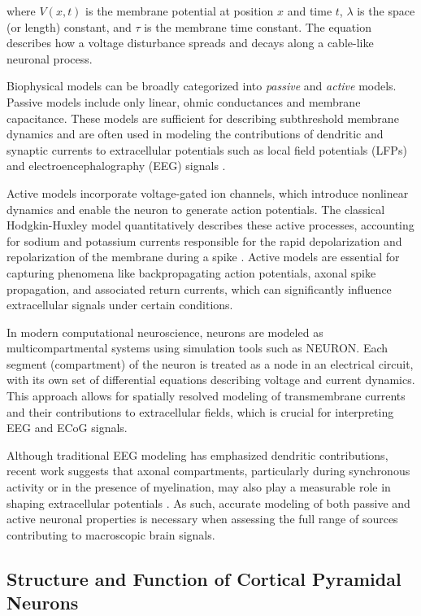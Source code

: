 \documentclass[final, a4paper,masters,en,listoffigures,listoftables,norwegiandates]{NMBU}
\begin{document}
where $V(x,t)$ is the membrane potential at position $x$ and time $t$, $\lambda$ is the space (or length) constant, and $\tau$ is the membrane time constant. The equation describes how a voltage disturbance spreads and decays along a cable-like neuronal process.

Biophysical models can be broadly categorized into \textit{passive} and \textit{active} models. Passive models include only linear, ohmic conductances and membrane capacitance. These models are sufficient for describing subthreshold membrane dynamics and are often used in modeling the contributions of dendritic and synaptic currents to extracellular potentials such as local field potentials (LFPs) and electroencephalography (EEG) signals \cite{Halnes2024ElectricBrainSignals}.

Active models incorporate voltage-gated ion channels, which introduce nonlinear dynamics and enable the neuron to generate action potentials. The classical Hodgkin-Huxley model quantitatively describes these active processes, accounting for sodium and potassium currents responsible for the rapid depolarization and repolarization of the membrane during a spike \cite{hodgkin1952quantitative}. Active models are essential for capturing phenomena like backpropagating action potentials, axonal spike propagation, and associated return currents, which can significantly influence extracellular signals under certain conditions.

In modern computational neuroscience, neurons are modeled as multicompartmental systems using simulation tools such as NEURON. Each segment (compartment) of the neuron is treated as a node in an electrical circuit, with its own set of differential equations describing voltage and current dynamics. This approach allows for spatially resolved modeling of transmembrane currents and their contributions to extracellular fields, which is crucial for interpreting EEG and ECoG signals.

Although traditional EEG modeling has emphasized dendritic contributions, recent work suggests that axonal compartments, particularly during synchronous activity or in the presence of myelination, may also play a measurable role in shaping extracellular potentials \cite{ness2016subthreshold, Halnes2024ElectricBrainSignals}. As such, accurate modeling of both passive and active neuronal properties is necessary when assessing the full range of sources contributing to macroscopic brain signals.

\subsection{Structure and Function of Cortical Pyramidal Neurons}
\end{document}
